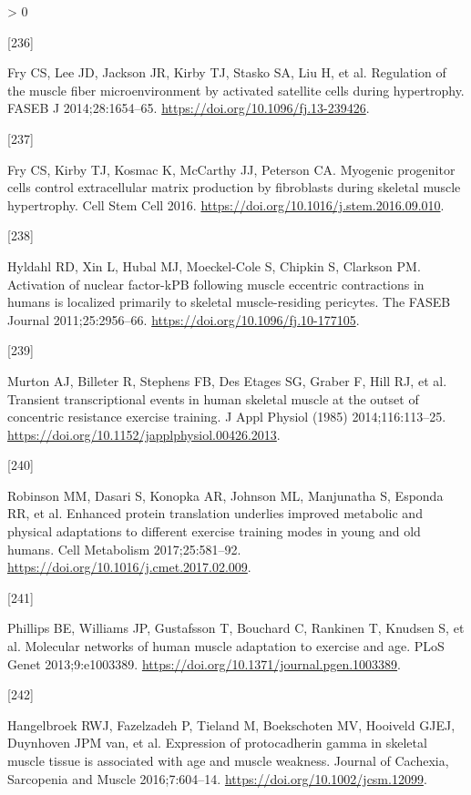 \documentclass[twoside,10pt]{gihclass} %
\newlength{\cslhangindent}
\newlength{\csllabelwidth}
\newenvironment{CSLReferences}[3] %
 {%
  \setlength{\parindent}{0pt}
  \ifodd #1 \everypar{\setlength{\hangindent}{\cslhangindent}}\ignorespaces\fi
  \ifnum #2 > 0
  \setlength{\parskip}{#2\baselineskip}
  \fi
 }%
 {}
\newcommand{\CSLLeftMargin}[1]{\parbox[t]{\maxof{\widthof{#1}}{\csllabelwidth}}{#1}}
\newcommand{\CSLRightInline}[1]{\parbox[t]{\linewidth}{#1}}
\begin{document}
\begin{CSLReferences}{0}{0}
\leavevmode\hypertarget{ref-RN1354}{}%
\CSLLeftMargin{{[}236{]} }
\CSLRightInline{Fry CS, Lee JD, Jackson JR, Kirby TJ, Stasko SA, Liu H, et al. Regulation of the muscle fiber microenvironment by activated satellite cells during hypertrophy. FASEB J 2014;28:1654--65. \url{https://doi.org/10.1096/fj.13-239426}.}

\leavevmode\hypertarget{ref-RN1888}{}%
\CSLLeftMargin{{[}237{]} }
\CSLRightInline{Fry CS, Kirby TJ, Kosmac K, McCarthy JJ, Peterson CA. Myogenic progenitor cells control extracellular matrix production by fibroblasts during skeletal muscle hypertrophy. Cell Stem Cell 2016. \url{https://doi.org/10.1016/j.stem.2016.09.010}.}

\leavevmode\hypertarget{ref-RN2408}{}%
\CSLLeftMargin{{[}238{]} }
\CSLRightInline{Hyldahl RD, Xin L, Hubal MJ, Moeckel-Cole S, Chipkin S, Clarkson PM. Activation of nuclear factor-kPB following muscle eccentric contractions in humans is localized primarily to skeletal muscle-residing pericytes. The FASEB Journal 2011;25:2956--66. \url{https://doi.org/10.1096/fj.10-177105}.}

\leavevmode\hypertarget{ref-RN2299}{}%
\CSLLeftMargin{{[}239{]} }
\CSLRightInline{Murton AJ, Billeter R, Stephens FB, Des Etages SG, Graber F, Hill RJ, et al. Transient transcriptional events in human skeletal muscle at the outset of concentric resistance exercise training. J Appl Physiol (1985) 2014;116:113--25. \url{https://doi.org/10.1152/japplphysiol.00426.2013}.}

\leavevmode\hypertarget{ref-RN2400}{}%
\CSLLeftMargin{{[}240{]} }
\CSLRightInline{Robinson MM, Dasari S, Konopka AR, Johnson ML, Manjunatha S, Esponda RR, et al. Enhanced protein translation underlies improved metabolic and physical adaptations to different exercise training modes in young and old humans. Cell Metabolism 2017;25:581--92. \url{https://doi.org/10.1016/j.cmet.2017.02.009}.}

\leavevmode\hypertarget{ref-RN753}{}%
\CSLLeftMargin{{[}241{]} }
\CSLRightInline{Phillips BE, Williams JP, Gustafsson T, Bouchard C, Rankinen T, Knudsen S, et al. Molecular networks of human muscle adaptation to exercise and age. PLoS Genet 2013;9:e1003389. \url{https://doi.org/10.1371/journal.pgen.1003389}.}

\leavevmode\hypertarget{ref-RN2402}{}%
\CSLLeftMargin{{[}242{]} }
\CSLRightInline{Hangelbroek RWJ, Fazelzadeh P, Tieland M, Boekschoten MV, Hooiveld GJEJ, Duynhoven JPM van, et al. Expression of protocadherin gamma in skeletal muscle tissue is associated with age and muscle weakness. Journal of Cachexia, Sarcopenia and Muscle 2016;7:604--14. \url{https://doi.org/10.1002/jcsm.12099}.}


\end{CSLReferences}
\end{document}
